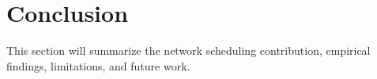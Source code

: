 \section{Conclusion}

This section will summarize the network scheduling contribution, empirical
findings, limitations, and future work.
